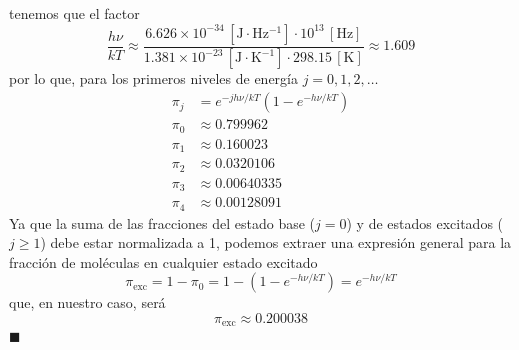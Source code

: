 \documentclass[]{article}
\numberwithin{equation}{section}
\newcommand{\0}{\textcolor{gray}{0}}
\newcommand{\qed}{\hfill\(\blacksquare\)}
\begin{document}
tenemos que el factor
\begin{equation}
	\frac{h \nu}{kT} \approx \frac{6.626 \times 10^{-34} \, \mathrm{[J \cdot Hz^{-1}]} \cdot 10^{13} \, \mathrm{[Hz]}}{1.381 \times 10^{-23} \, \mathrm{[J \cdot K^{-1}]} \cdot 298.15 \, \mathrm{[K]}} \approx 1.609
\end{equation}
por lo que, para los primeros niveles de energía $j=0,1,2,\ldots$
\begin{align*}
	\pi_j &= e^{-j h \nu/kT} \left(1 - e^{-h\nu/kT}\right)\\
	\pi_0 &\approx 0.799962\\
	\pi_1 &\approx 0.160023\\
	\pi_2 &\approx 0.0320106\\
	\pi_3 &\approx 0.00640335\\
	\pi_4 &\approx 0.00128091 
\end{align*}
Ya que la suma de las fracciones del estado base ($j = 0$) y de estados excitados ($j \geq 1$) debe estar normalizada a 1, podemos extraer una expresión general para la fracción de moléculas en cualquier estado excitado
\begin{equation}
	\pi_\mathrm{exc} = 1 - \pi_0 = 1 - \left(1 - e^{-h\nu/kT}\right) = e^{-h\nu/kT}
\end{equation}
que, en nuestro caso, será
\begin{equation}
	\pi_\mathrm{exc} \approx 0.200038
\end{equation}
\qed

\end{document}
